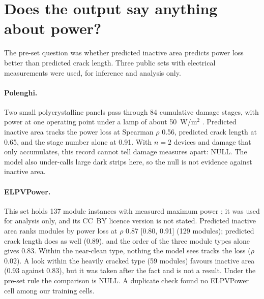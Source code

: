 
\section{Does the output say anything about power?}
\label{sec:deploy-power}

The pre-set question was whether predicted inactive area predicts power loss better than predicted crack length. Three public sets
with electrical measurements were used, for inference and analysis only.

\paragraph{Polenghi.} Two small polycrystalline panels pass through 84 cumulative damage stages, with power at one operating point
under a lamp of about 50~W/m$^2$ \citep{polenghi2026data}. Predicted inactive area tracks the power loss at Spearman $\rho$ 0.56,
predicted crack length at 0.65, and the stage number alone at 0.91. With $n=2$ devices and damage that only accumulates, this record
cannot tell damage measures apart: NULL. The model also under-calls large dark strips here, so the null is not evidence against
inactive area.

\paragraph{ELPVPower.} This set holds 137 module instances with measured maximum power \citep{hoffmann2020elpvpower}; it was used for
analysis only, and its CC~BY licence version is not stated. Predicted inactive area ranks modules by power loss at $\rho$ 0.87
[0.80, 0.91] (129 modules); predicted crack length does as well (0.89), and the order of the three module types alone gives 0.83.
Within the near-clean type, nothing the model sees tracks the loss ($\rho$ 0.02). A look within the heavily cracked type (59
modules) favours inactive area (0.93 against 0.83), but it was taken after the fact and is not a result. Under the pre-set rule the
comparison is NULL. A duplicate check found no ELPVPower cell among our training cells.

